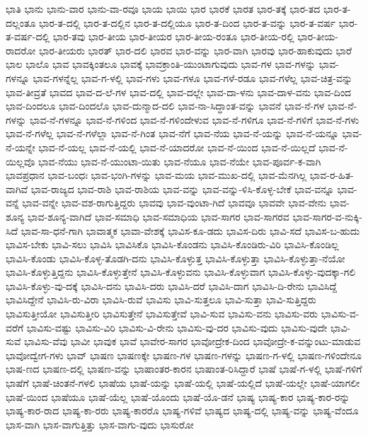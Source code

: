 ಭಾತಿ
ಭಾನು
ಭಾನು-ವಾರ
ಭಾನು-ವಾ-ರವೂ
ಭಾಯ
ಭಾಯಿ
ಭಾರ
ಭಾರಕೆ
ಭಾರತ
ಭಾರ-ತಕ್ಕೆ
ಭಾರ-ತದ
ಭಾರ-ತ-ದಲ್ಲಂತೂ
ಭಾರ-ತ-ದಲ್ಲಿ
ಭಾರ-ತ-ದಲ್ಲಿನ
ಭಾರ-ತ-ದಲ್ಲಿಯೂ
ಭಾರ-ತ-ದಿಂದ
ಭಾರ-ತ-ವನ್ನು
ಭಾರ-ತ-ವರ್ಷ
ಭಾರ-ತ-ವರ್ಷ-ದಲ್ಲಿ
ಭಾರ-ತವು
ಭಾರ-ತೀಯ
ಭಾರ-ತೀಯರ
ಭಾರ-ತೀಯ-ರಂತೂ
ಭಾರ-ತೀಯ-ರಲ್ಲಿ
ಭಾರ-ತೀಯ-ರಾದರೋ
ಭಾರ-ತೀಯರು
ಭಾರತ್
ಭಾರ-ದಲಿ
ಭಾರವ
ಭಾರ-ವನ್ನು
ಭಾರ-ವಾಗಿ
ಭಾರವು
ಭಾರ-ಹಾಕುವುದು
ಭಾರೆ
ಭಾಲ
ಭಾಲೊ
ಭಾವ
ಭಾವಕ್ಕಿಂತಲೂ
ಭಾವಕ್ಕೆ
ಭಾವಕ್ರಾಂತಿ-ಯುಂಟಾಗುವುದು
ಭಾವ-ಗಳ
ಭಾವ-ಗಳನ್ನು
ಭಾವ-ಗಳನ್ನೂ
ಭಾವ-ಗಳನ್ನೆಲ್ಲ
ಭಾವ-ಗ-ಳಲ್ಲಿ
ಭಾವ-ಗಳು
ಭಾವ-ಗಳೂ
ಭಾವ-ಗಳೆ-ರಡೂ
ಭಾವ-ಗಳೆಲ್ಲ
ಭಾವ-ಚಿತ್ರ-ವನ್ನು
ಭಾವ-ತೀವ್ರತೆ
ಭಾವದ
ಭಾವ-ದ-ಲೆ-ಗಳ
ಭಾವ-ದಲ್ಲಿ
ಭಾವ-ದಲ್ಲೇ
ಭಾವ-ದಾ-ಳನು
ಭಾವ-ದಾಳ-ವನು
ಭಾವ-ದಿಂದ
ಭಾವ-ದಿಂದಲೂ
ಭಾವ-ದಿಂದಲೊ
ಭಾವ-ದುನ್ಮಾದ-ದಲಿ
ಭಾವ-ನಾ-ಸಿದ್ಧಾಂತ-ವನ್ನು
ಭಾವನೆ
ಭಾವ-ನೆ-ಗಳ
ಭಾವ-ನೆ-ಗಳನ್ನು
ಭಾವ-ನೆ-ಗಳನ್ನೂ
ಭಾವ-ನೆ-ಗಳಿಂದ
ಭಾವ-ನೆ-ಗಳಿಂದೇಳುವ
ಭಾವ-ನೆ-ಗಳಿಗೂ
ಭಾವ-ನೆ-ಗಳಿಗೆ
ಭಾವ-ನೆ-ಗಳು
ಭಾವ-ನೆ-ಗಳೆಲ್ಲ
ಭಾವ-ನೆ-ಗಳೆಲ್ಲಾ
ಭಾವ-ನೆ-ಗಿಂತ
ಭಾವ-ನೆಗೆ
ಭಾವ-ನೆಯ
ಭಾವ-ನೆ-ಯನ್ನು
ಭಾವ-ನೆ-ಯನ್ನೂ
ಭಾವ-ನೆ-ಯನ್ನೇ
ಭಾವ-ನೆ-ಯಲ್ಲ
ಭಾವ-ನೆ-ಯಲ್ಲಿ
ಭಾವ-ನೆ-ಯಾದರೋ
ಭಾವ-ನೆ-ಯಿಂದ
ಭಾವ-ನೆ-ಯಿಲ್ಲದೆ
ಭಾವ-ನೆ-ಯಿಲ್ಲವೊ
ಭಾವ-ನೆಯು
ಭಾವ-ನೆ-ಯುಂಟಾ-ಯಿತು
ಭಾವ-ನೆಯೂ
ಭಾವ-ನೆಯೇ
ಭಾವ-ಪೂರ್ವ-ಕ-ವಾಗಿ
ಭಾವಪ್ರಧಾನ
ಭಾವ-ಬಂಧಃ
ಭಾವ-ಭಂಗಿ-ಗಳನ್ನು
ಭಾವ-ಮಯ
ಭಾವ-ಮುಖ-ದಲ್ಲಿ
ಭಾವ-ಮೆನಗಿಲ್ಲ
ಭಾವ-ರ-ಹಿತ-ವಾಗಿವೆ
ಭಾವ-ರಾಜ್ಯದ
ಭಾವ-ರಾಶಿ
ಭಾವ-ರಾಶಿಯ
ಭಾವ-ವನ್ನು
ಭಾವ-ವನ್ನು-ಳಿಸಿ-ಕೊಳ್ಳ-ಬೇಕೆ
ಭಾವ-ವನ್ನೂ
ಭಾವ-ವನ್ನೆ
ಭಾವ-ವನ್ನೇ
ಭಾವ-ವಶ-ರಾಗುತ್ತಿದ್ದರು
ಭಾವವು
ಭಾವ-ವುಂಟಾ-ಗಿದೆ
ಭಾವವೂ
ಭಾವವೇ
ಭಾವ-ವೇನು
ಭಾವ-ಶೂನ್ಯ
ಭಾವ-ಶೂನ್ಯ-ವಾಗಿದೆ
ಭಾವ-ಸಮಾಧಿ
ಭಾವ-ಸಮಾಧಿಯ
ಭಾವ-ಸಾಗರ
ಭಾವ-ಸಾಗರವ
ಭಾವ-ಸಾಗರ-ವ-ನುಕ್ಕಿ-ಸಿದೆ
ಭಾವ-ಸಾ-ಧನೆ-ಗಾಗಿ
ಭಾವಾತ್ಮಕ
ಭಾವಾ-ವೇಶಕ್ಕೆ
ಭಾವಿಸ-ಕೂ-ಡದು
ಭಾವಿಸ-ದಿರು
ಭಾವಿ-ಸದೆ
ಭಾವಿಸ-ಬ-ಹುದು
ಭಾವಿಸ-ಬೇಕು
ಭಾವಿ-ಸಲು
ಭಾವಿಸಿ
ಭಾವಿಸಿಕೊ
ಭಾವಿಸಿ-ಕೊಂಡನು
ಭಾವಿಸಿ-ಕೊಂಡಿರು-ವಿರಿ
ಭಾವಿಸಿ-ಕೊಂಡಿಲ್ಲ
ಭಾವಿಸಿ-ಕೊಂಡು
ಭಾವಿಸಿ-ಕೊಳ್ಳ-ತೊಡಗಿ-ದನು
ಭಾವಿಸಿ-ಕೊಳ್ಳುತ್ತ
ಭಾವಿಸಿ-ಕೊಳ್ಳುತ್ತಾ
ಭಾವಿಸಿ-ಕೊಳ್ಳುತ್ತಾ-ನೆಯೋ
ಭಾವಿಸಿ-ಕೊಳ್ಳುತ್ತಿದ್ದನು
ಭಾವಿಸಿ-ಕೊಳ್ಳುತ್ತೇನೆ
ಭಾವಿಸಿ-ಕೊಳ್ಳುವನು
ಭಾವಿಸಿ-ಕೊಳ್ಳುವಾಗ
ಭಾವಿಸಿ-ಕೊಳ್ಳು-ವುದಕ್ಕಾ-ಗಲಿ
ಭಾವಿಸಿ-ಕೊಳ್ಳು-ವು-ದಕ್ಕೆ
ಭಾವಿಸಿ-ದನು
ಭಾವಿಸಿ-ದರು
ಭಾವಿಸಿ-ದರೆ
ಭಾವಿಸಿ-ದಾಗ
ಭಾವಿಸಿ-ದಿ-ರೇನು
ಭಾವಿಸಿದ್ದೆ
ಭಾವಿಸಿದ್ದೇನೆ
ಭಾವಿಸಿ-ರು-ವಿರಾ
ಭಾವಿಸಿ-ರುವೆ
ಭಾವಿಸು
ಭಾವಿ-ಸುತ್ತಲೂ
ಭಾವಿ-ಸುತ್ತಾ
ಭಾವಿ-ಸುತ್ತಿದ್ದರು
ಭಾವಿಸುತ್ತೀಯೋ
ಭಾವಿಸುತ್ತೀರಿ
ಭಾವಿಸುತ್ತೇನೆ
ಭಾವಿಸುತ್ತೇವೆ
ಭಾವಿ-ಸುವ
ಭಾವಿಸು-ವನು
ಭಾವಿಸು-ವರು
ಭಾವಿಸು-ವ-ವರೆಗೆ
ಭಾವಿಸು-ವಷ್ಟು
ಭಾವಿಸು-ವಿರಿ
ಭಾವಿಸು-ವಿ-ರೇನು
ಭಾವಿಸು-ವು-ದರ
ಭಾವಿಸು-ವುದು
ಭಾವಿಸು-ವುದೇ
ಭಾವಿ-ಸುವೆ
ಭಾವಿಸು-ವೆವು
ಭಾವೀ
ಭಾವುಕ
ಭಾವೆ
ಭಾವೇರ-ಸಾಗರ
ಭಾವೋದ್ರೇಕ-ದಿಂದ
ಭಾವೋದ್ರೇ-ಕ-ವನ್ನುಂಟು-ಮಾಡುವ
ಭಾವೋದ್ವೇಗ-ಗಳು
ಭಾವ್
ಭಾಷಣ
ಭಾಷಣಕ್ಕೇ
ಭಾಷಣ-ಗಳ
ಭಾಷಣ-ಗಳನ್ನು
ಭಾಷಣ-ಗ-ಳಲ್ಲಿ
ಭಾಷಣ-ಗಳಿಂದೇನೂ
ಭಾಷ-ಣದ
ಭಾಷಣ-ದಲ್ಲಿ
ಭಾಷಣ-ವನ್ನು
ಭಾಷಾಂತರ-ಕಾರನ
ಭಾಷಾಂತ-ರಿಸಿದ್ದಾರೆ
ಭಾಷೆ
ಭಾಷೆ-ಗ-ಳಲ್ಲಿ
ಭಾಷೆ-ಗಳಿಗೆ
ಭಾಷೆಗೆ
ಭಾಷೆ-ಚಿಂತನೆ-ಗಳಲಿ
ಭಾಷೆಯ
ಭಾಷೆ-ಯನ್ನು
ಭಾಷೆ-ಯಲ್ಲಿ
ಭಾಷೆ-ಯಲ್ಲಿದೆ
ಭಾಷೆ-ಯಲ್ಲೇ
ಭಾಷೆ-ಯಾಗಲೀ
ಭಾಷೆ-ಯಿಂದ
ಭಾಷೆಯೂ
ಭಾಷೆ-ಯೆಲ್ಲ
ಭಾಷೆ-ಯೊಂದು
ಭಾಷೆ-ಯೊ-ಡನೆ
ಭಾಷ್ಯ
ಭಾಷ್ಯ-ಕಾರ
ಭಾಷ್ಯ-ಕಾರ-ರನ್ನು
ಭಾಷ್ಯ-ಕಾರ-ರಾದ
ಭಾಷ್ಯ-ಕಾ-ರರು
ಭಾಷ್ಯ-ಕಾರರೊ
ಭಾಷ್ಯ-ಗಳಿವೆ
ಭಾಷ್ಯದ
ಭಾಷ್ಯ-ದಲ್ಲಿ
ಭಾಷ್ಯ-ವನ್ನು
ಭಾಷ್ಯ-ವೆಂದೂ
ಭಾಸ-ವಾಗಿ
ಭಾಸ-ವಾಗುತ್ತಿತ್ತು
ಭಾಸ-ವಾಗು-ವುದು
ಭಾಸುರೋ
